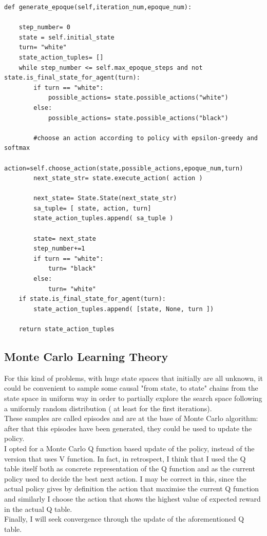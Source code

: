 \documentclass{article}
\begin{document}
				\begin{lstlisting}[caption= generate epoque function, label=exepred]
def generate_epoque(self,iteration_num,epoque_num):
		
	step_number= 0
	state = self.initial_state
	turn= "white"
	state_action_tuples= []
	while step_number <= self.max_epoque_steps and not state.is_final_state_for_agent(turn):
		if turn == "white":
			possible_actions= state.possible_actions("white")
		else:
			possible_actions= state.possible_actions("black")

		#choose an action according to policy with epsilon-greedy and softmax
		action=self.choose_action(state,possible_actions,epoque_num,turn)
		next_state_str= state.execute_action( action )
		
		next_state= State.State(next_state_str)
		sa_tuple= [ state, action, turn]
		state_action_tuples.append( sa_tuple )

		state= next_state
		step_number+=1
		if turn == "white":
			turn= "black"
		else:
			turn= "white"
	if state.is_final_state_for_agent(turn):
		state_action_tuples.append( [state, None, turn ])

	return state_action_tuples
\end{lstlisting}
				\newpage

				\subsection{Monte Carlo Learning Theory}
				For this kind of problems, with huge state spaces that initially are all unknown, it could be convenient to sample some causal "from state, to state"  chains from the state space in uniform way in order to partially explore the search space following a uniformly random distribution ( at least for the first iterations).\medskip\medskip\\These samples are called episodes and are at the base of Monte Carlo algorithm: after that this episodes have been generated, they could be used to update the policy.\medskip\medskip\\
				I opted for a Monte Carlo Q function based update of the policy, instead of the version that uses V function.
				In fact, in retrospect, I think that I used the Q table itself both as concrete representation of the Q function and as the current policy used to decide the best next action. I may be correct in this, since the actual policy gives by definition the action that maximise the current Q function and similarly I choose the action that shows the highest value of expected reward in the actual Q table.\medskip\\
				Finally, I will seek convergence through the update of the aforementioned Q table.
\end{document}
